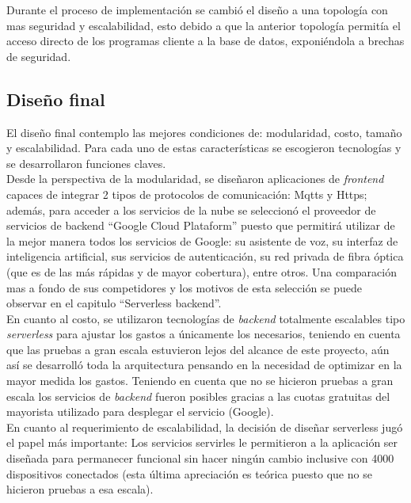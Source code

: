 Durante el proceso de implementación se cambió el diseño a una topología con mas seguridad y escalabilidad, esto debido a que la anterior topología permitía el acceso directo de los programas cliente a la base de datos, exponiéndola a brechas de seguridad.

\subsection{Diseño final}
El diseño final contemplo las mejores condiciones de: modularidad, costo, tamaño y escalabilidad. Para cada uno de estas características se escogieron tecnologías y se desarrollaron funciones claves. 
\vspace{0.5cm}\\
Desde la perspectiva de la modularidad, se diseñaron aplicaciones de \textit{frontend} capaces de integrar 2 tipos de protocolos de comunicación: Mqtts y Https; además, para acceder a los servicios de la nube se seleccionó el proveedor de servicios de backend ``Google Cloud Plataform'' puesto que permitirá utilizar de la mejor manera todos los servicios de Google: su asistente de voz, su interfaz de inteligencia artificial, sus servicios de autenticación, su red privada de fibra óptica (que es de las más rápidas y de mayor cobertura), entre otros. Una comparación mas a fondo de sus competidores y los motivos de esta selección se puede observar en el capitulo ``Serverless backend''.
\vspace{0.5cm}\\
En cuanto al costo, se utilizaron tecnologías de \textit{backend} totalmente escalables tipo \textit{serverless} para ajustar los gastos a únicamente los necesarios, teniendo en cuenta que las pruebas a gran escala estuvieron lejos del alcance de este proyecto, aún así se desarrolló toda la arquitectura pensando en la necesidad de optimizar en la mayor medida los gastos. Teniendo en cuenta que no se hicieron pruebas a gran escala los servicios de \textit{backend} fueron posibles gracias a las cuotas gratuitas del mayorista utilizado para desplegar el servicio (Google).
\vspace{0.5cm}\\
En cuanto al requerimiento de escalabilidad, la decisión de diseñar serverless jugó el papel más importante: Los servicios servirles le permitieron a la aplicación ser diseñada para permanecer funcional sin hacer ningún cambio inclusive con 4000 dispositivos conectados (esta última apreciación es teórica puesto que no se hicieron pruebas a esa escala).
\vspace{0.5cm}\\
